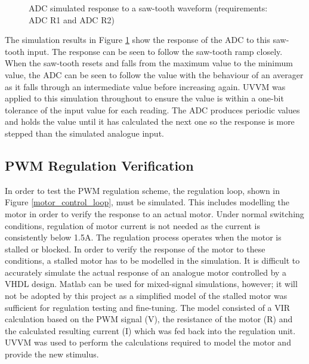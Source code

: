 \begin{figure}[h]
\centering
{}
\caption{ADC simulated response to a saw-tooth waveform (requirements: ADC R1 and ADC R2)}
\label{adc_sim}
\end{figure}

The simulation results in Figure \ref{adc_sim} show the response of the ADC to this saw-tooth input. The response can be seen to follow the saw-tooth ramp closely. When the saw-tooth resets and falls from the maximum value to the minimum value, the ADC can be seen to follow the value with the behaviour of an averager as it falls through an intermediate value before increasing again. UVVM was applied to this simulation throughout to ensure the value is within a one-bit tolerance of the input value for each reading. The ADC produces periodic values and holds the value until it has calculated the next one so the response is more stepped than the simulated analogue input. 

\subsection{PWM Regulation Verification}
\label{regulation-results}
In order to test the PWM regulation scheme, the regulation loop, shown in Figure \ref{motor_control_loop}, must be simulated. This includes modelling the motor in order to verify the response to an actual motor. Under normal switching conditions, regulation of motor current is not needed as the current is consistently below 1.5A. The regulation process operates when the motor is stalled or blocked. In order to verify the response of the motor to these conditions, a stalled motor has to be modelled in the simulation. It is difficult to accurately simulate the actual response of an analogue motor controlled by a VHDL design\cite{Dubey}. Matlab can be used for mixed-signal simulations\cite{Dubey}, however; it will not be adopted by this project as a simplified model of the stalled motor was sufficient for regulation testing and fine-tuning. The model consisted of a VIR calculation based on the PWM signal (V), the resistance of the motor (R) and the calculated resulting current (I) which was fed back into the regulation unit. UVVM was used to perform the calculations required to model the motor and provide the new stimulus.

